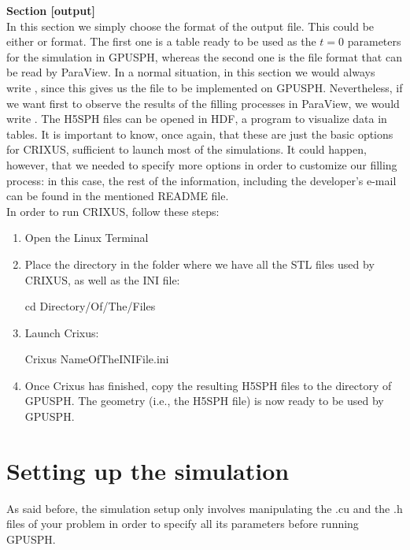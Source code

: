 \textbf{Section [output]}\\
In this section we simply choose the format of the output file. 
This could be either  or  format. 
The first one is a table ready to be used as the $t=0$ 
parameters for the simulation in GPUSPH, whereas the second 
one is the file format that can be read by ParaView. 
In a normal situation, in this section we would 
always write , since this gives us the file 
to be implemented on GPUSPH. Nevertheless, if we want first 
to observe the results of the filling processes in ParaView, 
we would write . 
The H5SPH files can be opened in HDF, a program to visualize data in tables.
It is important to know, once again, that these are just the basic options for CRIXUS, 
sufficient to launch most of the simulations. 
It could happen, however, that we needed to specify more options 
in order to customize our filling process: in this case, 
the rest of the information, including the developer’s e-mail 
can be found in the mentioned README file.\\

In order to run CRIXUS, follow these steps:
\begin{enumerate}
\item Open the Linux Terminal
\item Place the directory in the folder where we 
have all the STL files used by CRIXUS, as well as the INI file:
\begin{shellcode}
cd Directory/Of/The/Files
\end{shellcode}
\item Launch Crixus:
\begin{shellcode}
Crixus NameOfTheINIFile.ini
\end{shellcode}
\item Once Crixus has finished, copy the resulting H5SPH files to the  directory of GPUSPH. 
The geometry (i.e., the H5SPH file) is now ready to be used by GPUSPH.
\end{enumerate}

\section{Setting up the simulation}

As said before, the simulation setup only involves manipulating the .cu and the .h 
files of your problem in order to specify all its parameters before running GPUSPH. 

